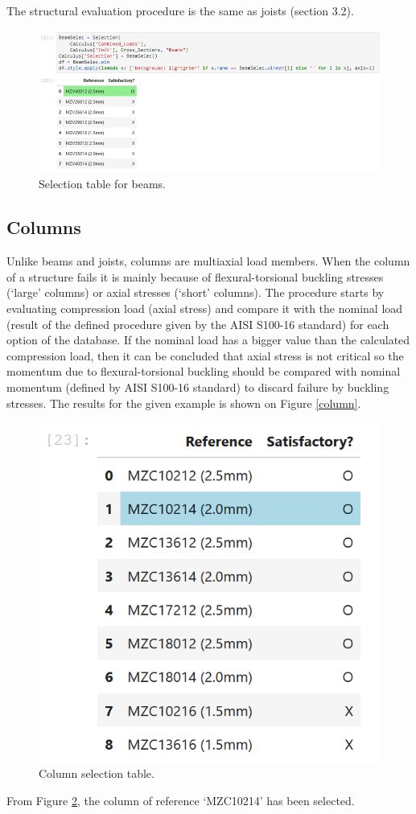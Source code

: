 The structural evaluation procedure is the same as joists (section 3.2).

\begin{figure}[h!]
\centering
\includegraphics[width=\textwidth]{Images/Calculus/vigaselec.PNG}
\caption{Selection table for beams.}
\label{beamselec}
\end{figure} 

\subsection{Columns}

Unlike beams and joists, columns are multiaxial load members. When the column of a structure fails it is mainly because of flexural-torsional buckling stresses (`large' columns) or axial stresses (`short' columns). The procedure starts by evaluating compression load (axial stress) and compare it with the nominal load (result of the defined procedure given by the AISI S100-16 standard)  for each option of the database. If the nominal load has a bigger value than the calculated compression load, then it can be concluded that axial stress is not critical so the momentum due to flexural-torsional buckling should be compared with nominal momentum (defined by AISI S100-16 standard) to discard failure by buckling stresses. The results for the given example is shown on Figure \ref{column}.

\begin{figure}[h!]
\centering
\includegraphics[width=\textwidth]{Images/Calculus/columnselec.PNG}
\caption{Column selection table.}
\label{columnselec}
\end{figure}

From Figure \ref{columnselec}, the column of reference `MZC10214' has been selected.